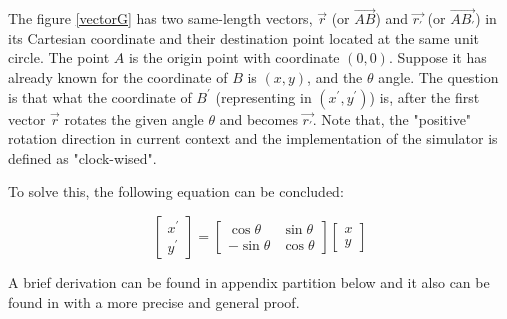 \par\noindent
The figure \ref{vectorG} has two same-length vectors,  $\vec{r}$ (or $\vec{AB}$) and $\vec{r_{'}}$ (or $\vec{AB_{'}}$) in its Cartesian coordinate and their destination point located at the same unit circle.
The point $A$ is the origin point with coordinate $(0, 0)$. Suppose it has already known for the coordinate of $B$ is
$(x,y)$, and the $\theta$ angle. The question is that what the coordinate of $B^{'} $ (representing in $(x^{'},y^{'})$) is, after the first vector $\vec{r}$ rotates the given angle $\theta$ and becomes $\vec{r_{'}}$.
Note that, the "positive" rotation direction in current context and the implementation of the simulator is defined as "clock-wised".

\par\noindent
To solve this, the following equation can be concluded:

\begin{equation} \label{Equ_ori}
  \begin{bmatrix}
   x^{'} \\ y^{'}
   \end{bmatrix} =   \begin{bmatrix}
      \cos\theta & \sin\theta \\
      -\sin\theta & \cos\theta
    \end{bmatrix} \begin{bmatrix}
      x \\ y
     \end{bmatrix}
\end{equation}


\par\noindent
A brief derivation can be found in appendix partition below and it also can be found in \cite{Mitnote09} with a more precise and general proof.


